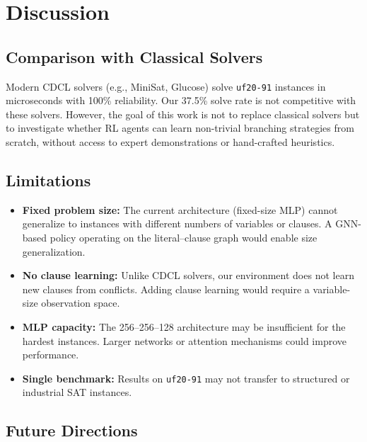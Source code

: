 \documentclass{article}
\begin{document}
\section{Discussion}

\subsection{Comparison with Classical Solvers}

Modern CDCL solvers (e.g., MiniSat, Glucose) solve \texttt{uf20-91} instances in microseconds with 100\% reliability. Our 37.5\% solve rate is not competitive with these solvers. However, the goal of this work is not to replace classical solvers but to investigate whether RL agents can learn non-trivial branching strategies from scratch, without access to expert demonstrations or hand-crafted heuristics.

\subsection{Limitations}

\begin{itemize}
    \item \textbf{Fixed problem size:} The current architecture (fixed-size MLP) cannot generalize to instances with different numbers of variables or clauses. A GNN-based policy operating on the literal--clause graph would enable size generalization.
    \item \textbf{No clause learning:} Unlike CDCL solvers, our environment does not learn new clauses from conflicts. Adding clause learning would require a variable-size observation space.
    \item \textbf{MLP capacity:} The 256--256--128 architecture may be insufficient for the hardest instances. Larger networks or attention mechanisms could improve performance.
    \item \textbf{Single benchmark:} Results on \texttt{uf20-91} may not transfer to structured or industrial SAT instances.
\end{itemize}

\subsection{Future Directions}
\end{document}
